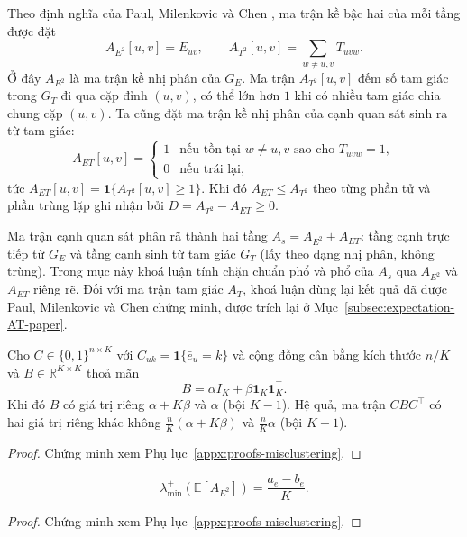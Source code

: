 Theo định nghĩa của Paul, Milenkovic và Chen \cite{paul2023hosc}, ma trận kề bậc hai của mỗi tầng được đặt
\[
    A_{E^2}[u, v] = E_{uv}, \qquad A_{T^2}[u, v] = \sum_{w \neq u, v} T_{uvw}.
\]
Ở đây $A_{E^2}$ là ma trận kề nhị phân của $G_E$. Ma trận $A_{T^2}[u, v]$ đếm số tam giác trong $G_T$ đi qua cặp đỉnh $(u, v)$, có thể lớn hơn $1$ khi có nhiều tam giác chia chung cặp $(u, v)$. Ta cũng đặt ma trận kề nhị phân của cạnh quan sát sinh ra từ tam giác:
\[
    A_{ET}[u, v] = \begin{cases}
        1 & \text{nếu tồn tại } w \neq u, v \text{ sao cho } T_{uvw} = 1, \\
        0 & \text{nếu trái lại},
    \end{cases}
\]
tức $A_{ET}[u, v] = \mathbf{1}\{A_{T^2}[u, v] \geq 1\}$. Khi đó $A_{ET} \leq A_{T^2}$ theo từng phần tử và phần trùng lặp ghi nhận bởi $D = A_{T^2} - A_{ET} \geq 0$.

Ma trận cạnh quan sát phân rã thành hai tầng $A_s = A_{E^2} + A_{ET}$: tầng cạnh trực tiếp từ $G_E$ và tầng cạnh sinh từ tam giác $G_T$ (lấy theo dạng nhị phân, không trùng). Trong mục này khoá luận tính chặn chuẩn phổ và phổ của $A_s$ qua $A_{E^2}$ và $A_{ET}$ riêng rẽ. Đối với ma trận tam giác $A_T$, khoá luận dùng lại kết quả đã được Paul, Milenkovic và Chen \cite{paul2023hosc} chứng minh, được trích lại ở Mục~\ref{subsec:expectation-AT-paper}.

\begin{lemma}
\label{lem:spectrum-CBCt}
Cho $C \in \{0, 1\}^{n \times K}$ với $C_{uk} = \mathbf{1}\{\bar e_u = k\}$ và cộng đồng cân bằng kích thước $n/K$ và $B \in \mathbb{R}^{K \times K}$ thoả mãn
\[
    B = \alpha I_K + \beta \mathbf{1}_K \mathbf{1}_K^\top.
\]
Khi đó $B$ có giá trị riêng $\alpha + K \beta$ và $\alpha$ (bội $K-1$). Hệ quả, ma trận $C B C^\top$ có hai giá trị riêng khác không $\frac{n}{K} (\alpha + K \beta)$ và $\frac{n}{K} \alpha$ (bội $K-1$).
\end{lemma}

\begin{proof}
Chứng minh xem Phụ lục~\ref{appx:proofs-misclustering}.
\end{proof}

\begin{lemma}
\label{lem:gap-AE}
\[
    \lambda_{\min}^+(\mathbb{E}[A_{E^2}]) = \frac{a_e - b_e}{K}.
\]
\end{lemma}

\begin{proof}
Chứng minh xem Phụ lục~\ref{appx:proofs-misclustering}.
\end{proof}

